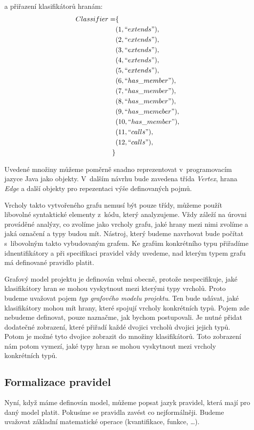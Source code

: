 a přiřazení klasifikátorů hranám:
\begin{align*}
  Classifier = &\{ \\
  &(1, ``extends"), \\
  &(2, ``extends"), \\
  &(3, ``extends"), \\
  &(4, ``extends"), \\
  &(5, ``extends"), \\
  &(6, ``has\_member"), \\
  &(7, ``has\_member"), \\
  &(8, ``has\_member"), \\
  &(9, ``has\_memeber"), \\
  &(10, ``has\_member"), \\
  &(11, ``calls"), \\
  &(12, ``calls"), \\
  \}
\end{align*}

Uvedené množiny můžeme poměrně snadno reprezentovat v~programovacím jazyce Java jako objekty. V~dalším návrhu bude zavedena třída \emph{Vertex}, hrana \emph{Edge} a další objekty pro repezentaci výše definovaných pojmů.

Vrcholy takto vytvořeného grafu nemusí být pouze třídy, můžeme použít libovolné syntaktické elementy z~kódu, který analyzujeme. Vždy záleží na úrovni prováděné analýzy, co zvolíme jako vrcholy grafu, jaké hrany mezi nimi zvolíme a jaká označení a typy budou mít. Nástroj, který budeme navrhovat bude počítat s~libovolným takto vybudovaným grafem. Ke grafům konkrétního typu přiřadíme idnentifikátory a při specifikaci pravidel vždy uvedeme, nad kterým typem grafu má definované pravidlo platit.

Grafový model projektu je definován velmi obecně, protože nespecifikuje, jaké klasifikátory hran se mohou vyskytnout mezi kterými typy vrcholů. Proto budeme uvažovat pojem \emph{typ grafového modelu projektu}. Ten bude udávat, jaké klasifikátory mohou mít hrany, které spojují vrcholy konkrétních typů. Pojem zde nebudeme definovat, pouze naznačme, jak bychom postupovali. Je nutné přidat dodatečné zobrazení, které přiřadí každé dvojici vrcholů dvojici jejich typů. Potom je možné tyto dvojice zobrazit do množiny klasifikátorů. Toto zobrazení nám potom vymezí, jaké typy hran se mohou vyskytnout mezi vrcholy konkrétních typů.

\subsection{Formalizace pravidel}
\label{design-rules_formalization}
Nyní, když máme definován model, můžeme popsat jazyk pravidel, která mají pro daný model platit. Pokusíme se pravidla zavést co nejformálněji. Budeme uvažovat základní matematické operace (kvantifikace, funkce, \ldots).

